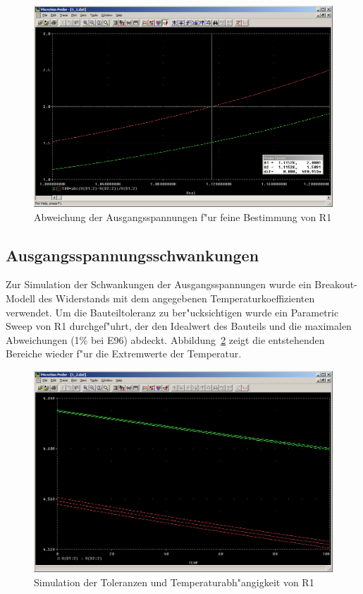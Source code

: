 \begin{figure}%
	\centering
	\includegraphics[width=\textwidth]{fig/bsp1/3_1_1_r1detail.PNG}
	\caption{Abweichung der Ausgangsspannungen f"ur feine Bestimmung von R1}
	\label{fig:3_1_1_r1detail}
\end{figure}


\subsection{Ausgangsspannungsschwankungen}

Zur Simulation der Schwankungen der Ausgangsspannungen wurde ein Breakout-Modell des Widerstands mit dem angegebenen Temperaturkoeffizienten verwendet. Um die Bauteiltoleranz zu ber"ucksichtigen wurde ein Parametric Sweep von R1 durchgef"uhrt, der den Idealwert des Bauteils und die maximalen Abweichungen (1\% bei E96) abdeckt. Abbildung~\ref{fig:3_1_2_e96dc} zeigt die entstehenden Bereiche wieder f"ur die Extremwerte der Temperatur.

\begin{figure}%
	\centering
	\includegraphics[width=\textwidth]{fig/bsp1/3_1_2_e96dc.PNG}
	\caption{Simulation der Toleranzen und Temperaturabh"angigkeit von R1}
	\label{fig:3_1_2_e96dc}
\end{figure}


